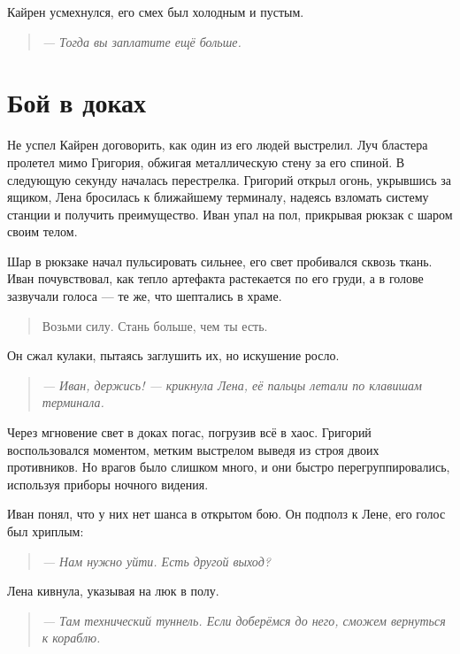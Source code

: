 \documentclass[12pt,a4paper]{book} %
\newenvironment{dialogue}{\begin{quote}\itshape}{\end{quote}}
\begin{document}
Кайрен усмехнулся, его смех был холодным и пустым.

\begin{dialogue}
--- Тогда вы заплатите ещё больше.
\end{dialogue}

\section*{Бой в доках}

Не успел Кайрен договорить, как один из его людей выстрелил. Луч бластера пролетел мимо Григория, обжигая металлическую стену за его спиной. В следующую секунду началась перестрелка. Григорий открыл огонь, укрывшись за ящиком, Лена бросилась к ближайшему терминалу, надеясь взломать систему станции и получить преимущество. Иван упал на пол, прикрывая рюкзак с шаром своим телом.

Шар в рюкзаке начал пульсировать сильнее, его свет пробивался сквозь ткань. Иван почувствовал, как тепло артефакта растекается по его груди, а в голове зазвучали голоса --- те же, что шептались в храме.

\begin{quote}
Возьми силу. Стань больше, чем ты есть.
\end{quote}

Он сжал кулаки, пытаясь заглушить их, но искушение росло.

\begin{dialogue}
--- Иван, держись! --- крикнула Лена, её пальцы летали по клавишам терминала.
\end{dialogue}

Через мгновение свет в доках погас, погрузив всё в хаос. Григорий воспользовался моментом, метким выстрелом выведя из строя двоих противников. Но врагов было слишком много, и они быстро перегруппировались, используя приборы ночного видения.

Иван понял, что у них нет шанса в открытом бою. Он подполз к Лене, его голос был хриплым:

\begin{dialogue}
--- Нам нужно уйти. Есть другой выход?
\end{dialogue}

Лена кивнула, указывая на люк в полу.

\begin{dialogue}
--- Там технический туннель. Если доберёмся до него, сможем вернуться к кораблю.
\end{dialogue}
\end{document}
